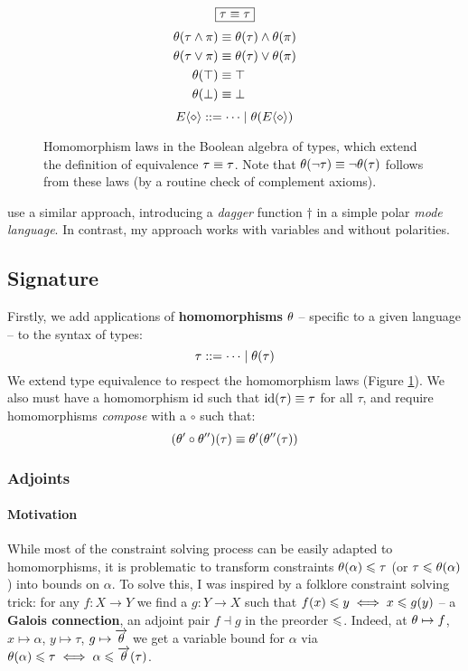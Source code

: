 \begin{figure}
    \centering
    $$\boxed{\tau \equiv \tau}$$
    \vspace{-2.5em}
    \begin{align*}
        \theta(\tau \land \pi) &\equiv \theta(\tau) \land \theta(\pi) \\
        \theta(\tau \lor \pi) &\equiv \theta(\tau) \lor \theta(\pi) \\
        \theta(\top) &\equiv \top \\
        \theta(\bot) &\equiv \bot
    \end{align*}
    \vspace{-1.5em}
    $$ \equivctx ::= \cdots \mid \morph(\equivctx) $$
    \caption{Homomorphism laws in the Boolean algebra of types, which extend the definition of equivalence $\tau \equiv \tau$. Note that $\theta(\lnot \tau) \equiv \lnot \theta(\tau)$ follows from these laws (by a routine check of complement axioms).}
    \label{fig:morphism-laws}
\end{figure}

\textcite{oxcaml} use a similar approach, introducing a \emph{dagger} function $\dagger$ in a simple polar \emph{mode language}. In contrast, my approach works with variables and without polarities.

\subsection{Signature}
\label{subsec:signature-morphisms}

Firstly, we add applications of \textbf{homomorphisms} $\theta$ -- specific to a given language -- to the syntax of types:
$$ \tau ::= \cdots \mid \theta(\tau) $$
We extend type equivalence to respect the homomorphism laws (Figure \ref{fig:morphism-laws}). We also must have a homomorphism $\mathrm{id}$ such that $\mathrm{id}(\tau) \equiv \tau$ for all $\tau$, and require homomorphisms \emph{compose} with a $\circ$ such that: $$\left( \morph' \circ \morph'' \right)(\tau) \equiv \morph'\left( \morph''(\tau) \right)$$

\subsubsection{Adjoints}

\paragraph{Motivation}
While most of the constraint solving process can be easily adapted to homomorphisms, it is problematic to transform constraints $\theta(\alpha) \leqslant \tau$ (or $\tau \leqslant \theta(\alpha)$) into bounds on $\alpha$. 
To solve this, I was inspired by a folklore constraint solving trick: for any $f : X \to Y$ we find a $g : Y \to X$ such that $f(x) \leqslant y \iff x \leqslant g(y)$ -- a \textbf{Galois connection}, \ie{} an adjoint pair $f \dashv g$ in the preorder $\leqslant$. Indeed, at $\theta \mapsto f$, $x \mapsto \alpha$, $y \mapsto \tau$, $g \mapsto \overrightarrow{\theta}$ we get a variable bound for $\alpha$ via $\theta(\alpha) \leqslant \tau \iff \alpha \leqslant \overrightarrow{\theta}(\tau)$.

